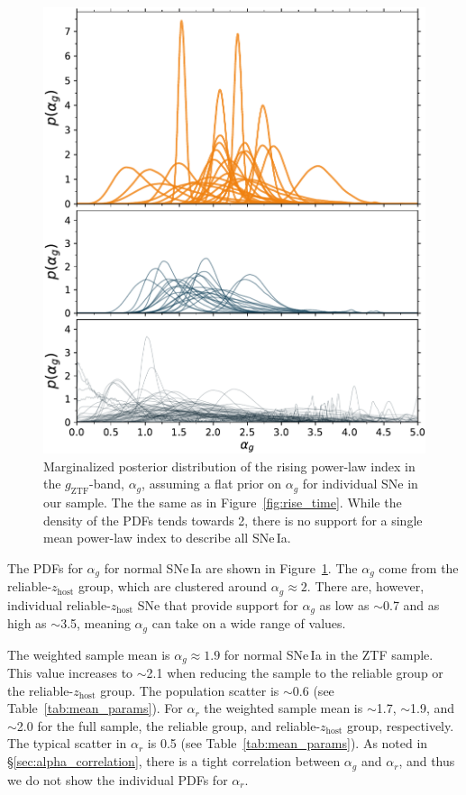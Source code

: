 \documentclass[twocolumn]{./aastex63}
\newcommand{\gztf}{$g_\mathrm{ZTF}$}
\begin{document}
\begin{figure}
    \centering
    \includegraphics[width=1\linewidth]{./figures/alpha_g.pdf}
    \caption{Marginalized posterior distribution of the rising power-law index
    in the \gztf-band, $\alpha_g$, assuming a flat prior on $\alpha_g$ for
    individual SNe in our sample. The  the
    same as in Figure~\ref{fig:rise_time}. While the density of the PDFs tends
    towards 2, there is no support for a single mean power-law index to
    describe all SNe\,Ia.}
    \label{fig:alpha_rise}
\end{figure}

The PDFs for $\alpha_g$ for normal SNe\,Ia are shown in
Figure~\ref{fig:alpha_rise}. The  $\alpha_g$
come from the reliable-$z_\mathrm{host}$ group, which are clustered around
$\alpha_g \approx 2$. There are, however, individual
reliable-$z_\mathrm{host}$ SNe that provide support for $\alpha_g$ as low as
$\sim$0.7 and as high as $\sim$3.5, meaning $\alpha_g$ can take on a wide
range of values.

The weighted sample mean is $\alpha_g \approx 1.9$ for normal SNe\,Ia in the
ZTF sample. This value increases to $\sim$2.1 when reducing the sample to the
reliable group or the reliable-$z_\mathrm{host}$ group. The population scatter
is $\sim$0.6 (see Table~\ref{tab:mean_params}). For $\alpha_r$ the weighted
sample mean is $\sim$1.7, $\sim$1.9, and $\sim$2.0 for the full sample, the
reliable group, and reliable-$z_\mathrm{host}$ group, respectively. The
typical scatter in $\alpha_r$ is 0.5 (see Table~\ref{tab:mean_params}). As
noted in \S\ref{sec:alpha_correlation}, there is a tight correlation
between $\alpha_g$ and $\alpha_r$, and thus we do not show the individual PDFs
for $\alpha_r$.
\end{document}
